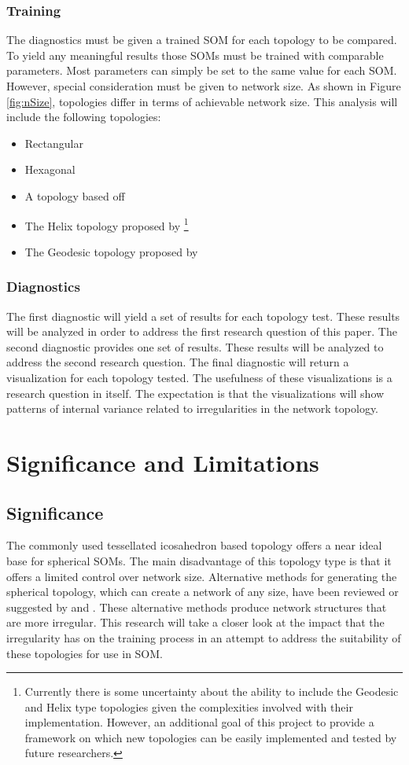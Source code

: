 \documentclass[10pt,titlepage]{article}
\begin{document}
\subsubsection{Training}
The diagnostics must be given a trained SOM for each topology to be compared. To
yield any meaningful results those SOMs must be trained with comparable
parameters. Most parameters can simply be set to the same value for each SOM.
However, special consideration must be given to network size.  As shown in
Figure \ref{fig:nSize}, topologies differ in terms of achievable network size.
This analysis will include the following topologies:
\begin{itemize}
\item Rectangular
\item Hexagonal
\item A topology based off \cite{Rakhmanov94}
\item The Helix topology proposed by \cite{Nishio:2006fk}\footnote{Currently
there is some uncertainty about the ability to include the Geodesic and Helix
type topologies given the complexities involved with their implementation.
However, an additional goal of this project to provide a framework on which new
topologies can be easily implemented and tested by future researchers.}
\item The Geodesic topology proposed by \cite{wu2006}\footnotemark[2]
\end{itemize}

\subsubsection{Diagnostics}
The first diagnostic will yield a set of results for each topology test.  These
results will be analyzed in order to address the first research question of this
paper.  The second diagnostic provides one set of results.  These results will
be analyzed to address the second research question.  The final diagnostic will
return a visualization for each topology tested.  The usefulness of these
visualizations is a research question in itself.  The expectation is that the
visualizations will show patterns of internal variance related to irregularities
in the network topology.

\section{Significance and Limitations}
\subsection{Significance}
The commonly used tessellated icosahedron based topology offers a near ideal
base for spherical SOMs.  The main disadvantage of this topology type is that it
offers a limited control over network size.  Alternative methods for generating
the spherical topology, which can create a network of any size, have been
reviewed or suggested by \cite{wu2005} and \cite{Nishio:2006fk}.  These
alternative methods produce network structures that are more irregular.  This
research will take a closer look at the impact that the irregularity has on the
training process in an attempt to address the suitability of these topologies
for use in SOM.
\end{document}
